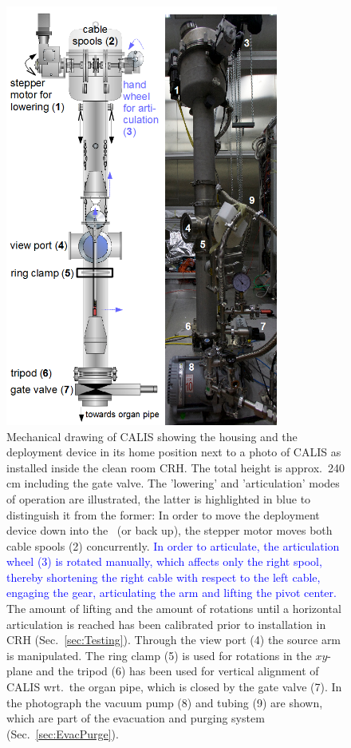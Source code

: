 \begin{figure}[htbp]
 \centering
\includegraphics[width=0.8\textwidth]{Figures/CALIS_overview.png}
 \caption{Mechanical drawing of CALIS showing the housing and the deployment device in its home position next to a photo of CALIS as installed inside the clean room CRH. The total height is approx.~240 cm including the gate valve. The 'lowering' and 'articulation' modes of operation are illustrated, the latter is highlighted in blue to distinguish it from the former: In order to move the deployment device down into the \lsv\ (or back up), the stepper motor moves both cable spools (2) concurrently. \textcolor{blue}{In order to articulate, the articulation wheel (3) is rotated manually, which affects only the right spool, thereby shortening the right cable with respect to the left cable, engaging the gear, articulating the arm and lifting the pivot center.} The amount of lifting and the amount of rotations until a horizontal articulation is reached has been calibrated prior to installation in CRH (Sec.~\ref{sec:Testing}). Through the view port (4) the source arm is manipulated. The ring clamp (5) is used for rotations in the $xy$-plane and the tripod (6) has been used for vertical alignment of CALIS wrt.~the organ pipe, which is closed by the gate valve (7). 
In the photograph the vacuum pump (8) and tubing (9) are shown, which are part of the evacuation and purging system (Sec.~\ref{sec:EvacPurge}). \label{fig:CALISDimensions}\label{fig:CALISMechanism}\label{fig:gearDrawing}\label{fig:flushing_purging}
}
\end{figure}

